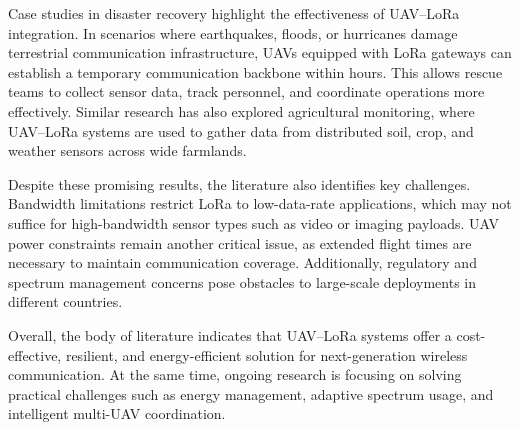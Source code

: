 Case studies in disaster recovery highlight the effectiveness of UAV–LoRa integration. In scenarios where earthquakes, floods, or hurricanes damage terrestrial communication infrastructure, UAVs equipped with LoRa gateways can establish a temporary communication backbone within hours. This allows rescue teams to collect sensor data, track personnel, and coordinate operations more effectively. Similar research has also explored agricultural monitoring, where UAV–LoRa systems are used to gather data from distributed soil, crop, and weather sensors across wide farmlands.

Despite these promising results, the literature also identifies key challenges. Bandwidth limitations restrict LoRa to low-data-rate applications, which may not suffice for high-bandwidth sensor types such as video or imaging payloads. UAV power constraints remain another critical issue, as extended flight times are necessary to maintain communication coverage. Additionally, regulatory and spectrum management concerns pose obstacles to large-scale deployments in different countries.

Overall, the body of literature indicates that UAV–LoRa systems offer a cost-effective, resilient, and energy-efficient solution for next-generation wireless communication. At the same time, ongoing research is focusing on solving practical challenges such as energy management, adaptive spectrum usage, and intelligent multi-UAV coordination.